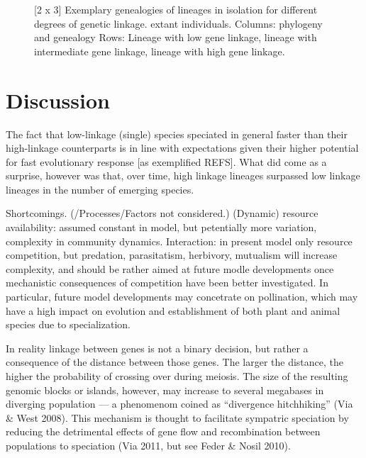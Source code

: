 \documentclass[a4paper]{scrartcl}
\begin{document}
\begin{figure}
  \caption{[2 x 3]
    Exemplary genealogies of lineages in isolation for different degrees of genetic linkage.
    extant individuals.
    Columns: phylogeny and genealogy
    Rows: Lineage with low gene linkage,
    lineage with intermediate gene linkage,
    lineage with high gene linkage.}
  \label{phylogenies}
\end{figure}

\section{Discussion}
The fact that low-linkage (single) species speciated in general faster than their high-linkage counterparts
is in line with expectations given their higher potential for fast evolutionary response [as exemplified REFS].
What did come as a surprise, however was that, over time, high linkage lineages surpassed low linkage lineages
in the number of emerging species.



Shortcomings. (/Processes/Factors not considered.)
(Dynamic) resource availability: assumed constant in model, but petentially more variation, complexity in community dynamics.
Interaction: in present model only resource competition, %
but predation, parasitatism, herbivory, mutualism will increase complexity,
and should be rather aimed at future modle developments once mechanistic consequences of competition have been better investigated.
In particular, future model developments may concetrate on pollination,
which may have a high impact on evolution and establishment of both plant and animal species due to specialization. %

In reality linkage between genes is not a binary decision, but rather a consequence of the distance between those genes.
The larger the distance, the higher the probability of crossing over during meiosis.
The size of the resulting genomic blocks or islands, however, may increase to several megabases in diverging population ---
a phenomenom coined as ``divergence hitchhiking'' (Via \& West 2008). %
This mechanism is thought to facilitate sympatric speciation by reducing the detrimental effects of gene flow and
recombination between populations to speciation (Via 2011, but see Feder \& Nosil 2010).
\end{document}
